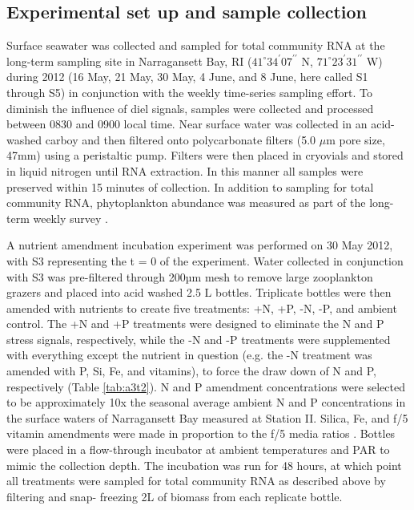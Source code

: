 \subsection{Experimental set up and sample collection}
Surface seawater was collected and sampled for total community RNA at the long-term sampling site in Narragansett Bay, RI ($41^\circ 34^\prime 07^{\prime \prime}$ N, $71^\circ 23^\prime 31^{\prime \prime}$ W) during 2012 (16 May, 21 May, 30 May, 4 June, and 8 June, here called S1 through S5) in conjunction with the weekly time-series sampling effort. To diminish the influence of diel signals, samples were collected and processed between 0830 and 0900 local time. Near surface water was collected in an acid-washed carboy and then filtered onto polycarbonate filters (5.0 $\mu$m pore size, 47mm) using a peristaltic pump. Filters were then placed in cryovials and stored in liquid nitrogen until RNA extraction. In this manner all samples were preserved within 15 minutes of collection. In addition to sampling for total community RNA, phytoplankton abundance was measured as part of the long-term weekly survey \citep{Furnas1983, Furnas1982}.\par
A nutrient amendment incubation experiment was performed on 30 May 2012, with S3 representing the t = 0 of the experiment. Water collected in conjunction with S3 was pre-filtered through 200µm mesh to remove large zooplankton grazers and placed into acid washed 2.5 L bottles. Triplicate bottles were then amended with nutrients to create five treatments: +N, +P, -N, -P, and ambient control. The +N and +P treatments were designed to eliminate the N and P stress signals, respectively, while the -N and -P treatments were supplemented with everything except the nutrient in question (e.g. the -N treatment was amended with P, Si, Fe, and vitamins), to force the draw down of N and P, respectively (Table \ref{tab:a3t2}). N and P amendment concentrations were selected to be approximately 10x the seasonal average ambient N and P concentrations in the surface waters of Narragansett Bay measured at Station II. Silica, Fe, and f/5 vitamin amendments were made in proportion to the f/5 media ratios \citep{Guillard1975}. Bottles were placed in a flow-through incubator at ambient temperatures and PAR to mimic the collection depth. The incubation was run for 48 hours, at which point all treatments were sampled for total community RNA as described above by filtering and snap- freezing 2L of biomass from each replicate bottle. \par
